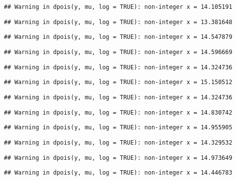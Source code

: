 \documentclass[
]{article}
\begin{document}
\begin{verbatim}
## Warning in dpois(y, mu, log = TRUE): non-integer x = 14.105191
\end{verbatim}

\begin{verbatim}
## Warning in dpois(y, mu, log = TRUE): non-integer x = 13.381648
\end{verbatim}

\begin{verbatim}
## Warning in dpois(y, mu, log = TRUE): non-integer x = 14.547879
\end{verbatim}

\begin{verbatim}
## Warning in dpois(y, mu, log = TRUE): non-integer x = 14.596669
\end{verbatim}

\begin{verbatim}
## Warning in dpois(y, mu, log = TRUE): non-integer x = 14.324736
\end{verbatim}

\begin{verbatim}
## Warning in dpois(y, mu, log = TRUE): non-integer x = 15.150512
\end{verbatim}

\begin{verbatim}
## Warning in dpois(y, mu, log = TRUE): non-integer x = 14.324736
\end{verbatim}

\begin{verbatim}
## Warning in dpois(y, mu, log = TRUE): non-integer x = 14.830742
\end{verbatim}

\begin{verbatim}
## Warning in dpois(y, mu, log = TRUE): non-integer x = 14.955905
\end{verbatim}

\begin{verbatim}
## Warning in dpois(y, mu, log = TRUE): non-integer x = 14.329532
\end{verbatim}

\begin{verbatim}
## Warning in dpois(y, mu, log = TRUE): non-integer x = 14.973649
\end{verbatim}

\begin{verbatim}
## Warning in dpois(y, mu, log = TRUE): non-integer x = 14.446783
\end{verbatim}
\end{document}

